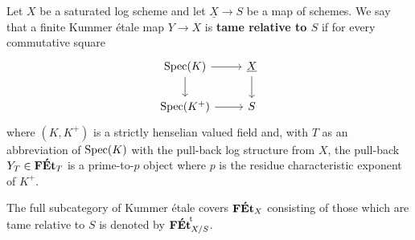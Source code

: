 \begin{defi} \label{def:tame-log}
    Let $X$ be a saturated log scheme and let $\underline{X}\to S$ be a map of schemes. 
    We say that a finite Kummer \'etale map $Y\to X$ is {\bf tame relative to $S$} if for every commutative square
    \begin{equation} \label{eqn:tame-log-test-sq}
        \begin{tikzcd}
            \Spec(K)\ar[r] \ar[d] & \underline{X}\ar[d] \\
            \Spec(K^+) \ar[r] & S
        \end{tikzcd}
    \end{equation}
    where $(K, K^+)$ is a strictly henselian valued field and, with $T$ as an abbreviation of $\operatorname{Spec}(K)$ with the pull-back log structure from $X$, the pull-back $Y_T \in \mathbf{F\acute{E}t}_{T}$ is a prime-to-$p$ object where $p$ is the residue characteristic exponent of $K^+$. 
    
    The full subcategory of Kummer \'etale covers $\mathbf{F\acute{E}t}_X$ consisting of those which are tame relative to $S$ is denoted by ${\mathbf{F\acute{E}t}}^{\!\mathrm{t}}_{X/S}$.
\end{defi}

